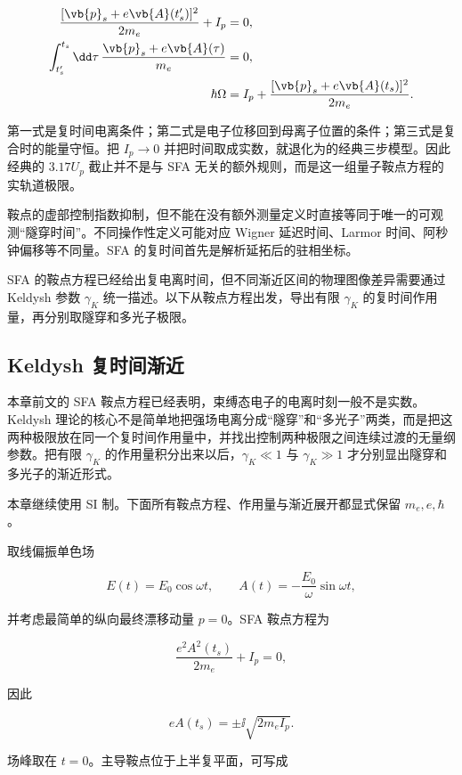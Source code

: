 \begin{align*}
\frac{[\vb{p}_s+e\vb{A}(t_s')]^2}{2m_e}+I_p&=0,
\\
\int_{t_s'}^{t_s}\dd\tau\,\frac{\vb{p}_s+e\vb{A}(\tau)}{m_e}&=0,
\\
\hbar\Omega&=I_p+\frac{[\vb{p}_s+e\vb{A}(t_s)]^2}{2m_e}.
\end{align*}

第一式是复时间电离条件；第二式是电子位移回到母离子位置的条件；第三式是复合时的能量守恒。把 \(I_p\to0\) 并把时间取成实数，就退化为的经典三步模型。因此经典的 \(3.17U_p\) 截止并不是与 SFA 无关的额外规则，而是这一组量子鞍点方程的实轨道极限。

\begin{note}
鞍点的虚部控制指数抑制，但不能在没有额外测量定义时直接等同于唯一的可观测“隧穿时间”。不同操作性定义可能对应 Wigner 延迟时间、Larmor 时间、阿秒钟偏移等不同量。SFA 的复时间首先是解析延拓后的驻相坐标。
\end{note}

SFA 的鞍点方程已经给出复电离时间，但不同渐近区间的物理图像差异需要通过 Keldysh 参数 $\gamma_K$ 统一描述。以下从鞍点方程出发，导出有限 $\gamma_K$ 的复时间作用量，再分别取隧穿和多光子极限。

\subsection{Keldysh 复时间渐近}\label{sec:keldysh-complex-time}

本章前文的 SFA 鞍点方程已经表明，束缚态电子的电离时刻一般不是实数。Keldysh 理论的核心不是简单地把强场电离分成“隧穿”和“多光子”两类，而是把这两种极限放在同一个复时间作用量中，并找出控制两种极限之间连续过渡的无量纲参数。把有限 \(\gamma_K\) 的作用量积分出来以后，\(\gamma_K\ll1\) 与 \(\gamma_K\gg1\) 才分别显出隧穿和多光子的渐近形式。

本章继续使用 SI 制。下面所有鞍点方程、作用量与渐近展开都显式保留 \(m_e,e,\hbar\)。

取线偏振单色场

\[
E(t)=E_0\cos\omega t,
\qquad
A(t)=-\frac{E_0}{\omega}\sin\omega t,
\]

并考虑最简单的纵向最终漂移动量 \(p=0\)。SFA 鞍点方程为

\[
\frac{e^2A^2(t_s)}{2m_e}+I_p=0,
\]

因此

\[
eA(t_s)=\pm \ii\sqrt{2m_eI_p}.
\]

场峰取在 \(t=0\)。主导鞍点位于上半复平面，可写成


